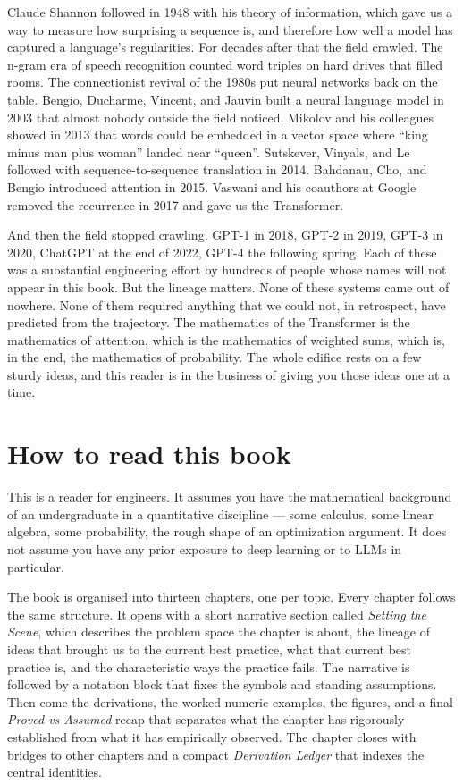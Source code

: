 \documentclass[11pt,a4paper,openany]{book}
\begin{document}
Claude Shannon followed in 1948 with his theory of information,
which gave us a way to measure how surprising a sequence is, and
therefore how well a model has captured a language's regularities.
For decades after that the field crawled. The n-gram era of speech
recognition counted word triples on hard drives that filled rooms.
The connectionist revival of the 1980s put neural networks back on
the table. Bengio, Ducharme, Vincent, and Jauvin built a neural
language model in 2003 that almost nobody outside the field
noticed. Mikolov and his colleagues showed in 2013 that words could
be embedded in a vector space where ``king minus man plus woman''
landed near ``queen''. Sutskever, Vinyals, and Le followed with
sequence-to-sequence translation in 2014. Bahdanau, Cho, and Bengio
introduced attention in 2015. Vaswani and his coauthors at Google
removed the recurrence in 2017 and gave us the Transformer.

And then the field stopped crawling. GPT-1 in 2018, GPT-2 in 2019,
GPT-3 in 2020, ChatGPT at the end of 2022, GPT-4 the following
spring. Each of these was a substantial engineering effort by
hundreds of people whose names will not appear in this book. But
the lineage matters. None of these systems came out of nowhere.
None of them required anything that we could not, in retrospect,
have predicted from the trajectory. The mathematics of the
Transformer is the mathematics of attention, which is the
mathematics of weighted sums, which is, in the end, the mathematics
of probability. The whole edifice rests on a few sturdy ideas, and
this reader is in the business of giving you those ideas one at a
time.

\section*{How to read this book}

This is a reader for engineers. It assumes you have the
mathematical background of an undergraduate in a quantitative
discipline --- some calculus, some linear algebra, some probability,
the rough shape of an optimization argument. It does not assume you
have any prior exposure to deep learning or to LLMs in particular.

The book is organised into thirteen chapters, one per topic. Every
chapter follows the same structure. It opens with a short narrative
section called \emph{Setting the Scene}, which describes the
problem space the chapter is about, the lineage of ideas that
brought us to the current best practice, what that current best
practice is, and the characteristic ways the practice fails. The
narrative is followed by a notation block that fixes the symbols
and standing assumptions. Then come the derivations, the worked
numeric examples, the figures, and a final \emph{Proved vs Assumed}
recap that separates what the chapter has rigorously established
from what it has empirically observed. The chapter closes with
bridges to other chapters and a compact \emph{Derivation Ledger}
that indexes the central identities.
\end{document}
